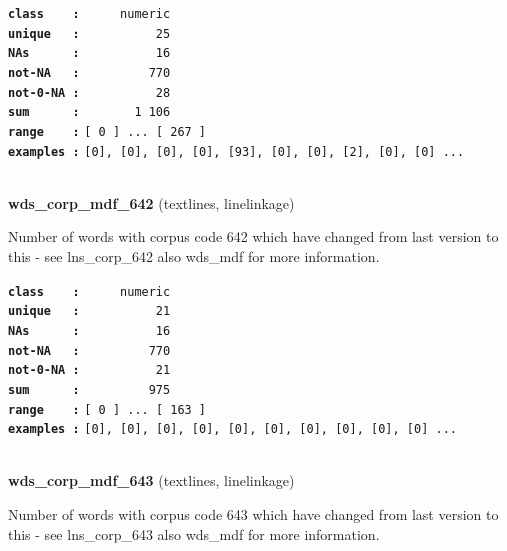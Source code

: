 \documentclass[]{article}
\begin{document}
\textbf{\texttt{class\ \ \ \ :}} \texttt{~~~~~numeric}\\
\textbf{\texttt{unique\ \ \ :}} \texttt{~~~~~~~~~~25}\\
\textbf{\texttt{NAs\ \ \ \ \ \ :}} \texttt{~~~~~~~~~~16}\\
\textbf{\texttt{not-NA\ \ \ :}} \texttt{~~~~~~~~~770}\\
\textbf{\texttt{not-0-NA\ :}} \texttt{~~~~~~~~~~28}\\
\textbf{\texttt{sum\ \ \ \ \ \ :}} \texttt{~~~~~~~1~106}\\
\textbf{\texttt{range\ \ \ \ :}}
\texttt{{[}\ 0\ {]}\ ...\ {[}\ 267\ {]}}\\
\textbf{\texttt{examples\ :}}
\texttt{{[}0{]},\ {[}0{]},\ {[}0{]},\ {[}0{]},\ {[}93{]},\ {[}0{]},\ {[}0{]},\ {[}2{]},\ {[}0{]},\ {[}0{]}\ ...}\\

~

\textbf{wds\_corp\_mdf\_642} (textlines, linelinkage)

Number of words with corpus code 642 which have changed from last
version to this - see lns\_corp\_642 also wds\_mdf for more information.

\textbf{\texttt{class\ \ \ \ :}} \texttt{~~~~~numeric}\\
\textbf{\texttt{unique\ \ \ :}} \texttt{~~~~~~~~~~21}\\
\textbf{\texttt{NAs\ \ \ \ \ \ :}} \texttt{~~~~~~~~~~16}\\
\textbf{\texttt{not-NA\ \ \ :}} \texttt{~~~~~~~~~770}\\
\textbf{\texttt{not-0-NA\ :}} \texttt{~~~~~~~~~~21}\\
\textbf{\texttt{sum\ \ \ \ \ \ :}} \texttt{~~~~~~~~~975}\\
\textbf{\texttt{range\ \ \ \ :}}
\texttt{{[}\ 0\ {]}\ ...\ {[}\ 163\ {]}}\\
\textbf{\texttt{examples\ :}}
\texttt{{[}0{]},\ {[}0{]},\ {[}0{]},\ {[}0{]},\ {[}0{]},\ {[}0{]},\ {[}0{]},\ {[}0{]},\ {[}0{]},\ {[}0{]}\ ...}\\

~

\textbf{wds\_corp\_mdf\_643} (textlines, linelinkage)

Number of words with corpus code 643 which have changed from last
version to this - see lns\_corp\_643 also wds\_mdf for more information.
\end{document}
